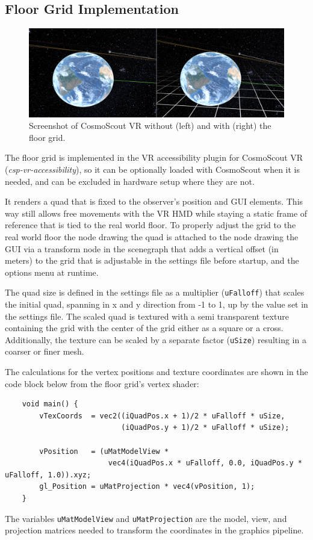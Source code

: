 \subsection{Floor Grid Implementation}\label{subsec:floor-grid-implementation}

\begin{figure}[h]
    \centering
    \includegraphics[width=\textwidth]{content/4_1_floorGrid/img/FloorGrid_Screenshot}
    \caption{Screenshot of CosmoScout VR without (left) and with (right) the floor grid.}
    \label{fig:floor-grid-screenshot}
\end{figure}

The floor grid is implemented in the VR accessibility plugin for CosmoScout VR (\textit{csp-vr-accessibility}), so it
can be optionally loaded with CosmoScout when it is needed, and can be excluded in hardware setup where they are not.

It renders a quad that is fixed to the observer's position and GUI elements.
This way still allows free movements with the VR HMD while staying a static frame of reference that is tied to
the real world floor.
To properly adjust the grid to the real world floor the node drawing the quad is attached to the node drawing the GUI
via a transform node in the scenegraph that adds a vertical offset (in meters) to the grid that is adjustable in the
settings file before startup, and the options menu at runtime.

The quad size is defined in the settings file as a multiplier (\texttt{uFalloff}) that scales
the initial quad, spanning in x and y direction from -1 to 1, up by the value set in the settings file.
The scaled quad is textured with a semi transparent texture containing the grid with the center of the grid either as a
square or a cross.
Additionally, the texture can be scaled by a separate factor (\texttt{uSize}) resulting in a
coarser or finer mesh.

The calculations for the vertex positions and texture coordinates are shown in the code block below from the floor
grid's vertex shader:
\begin{verbatim}
    void main() {
        vTexCoords  = vec2((iQuadPos.x + 1)/2 * uFalloff * uSize,
                           (iQuadPos.y + 1)/2 * uFalloff * uSize);

        vPosition   = (uMatModelView *
                        vec4(iQuadPos.x * uFalloff, 0.0, iQuadPos.y * uFalloff, 1.0)).xyz;
        gl_Position = uMatProjection * vec4(vPosition, 1);
    }
\end{verbatim}
The variables \texttt{uMatModelView} and \texttt{uMatProjection} are the model, view, and projection
matrices needed to transform the coordinates in the graphics pipeline.

